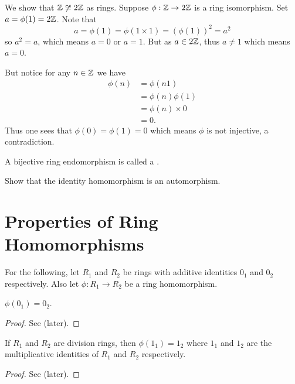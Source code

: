 \begin{example}
    We show that $\mathbb{Z} \not\cong 2\mathbb{Z}$ as rings. Suppose $\phi: \mathbb{Z} \to 2\mathbb{Z}$ is a ring isomorphism. Set $a = \phi(1) = 2\mathbb{Z}$. Note that
    \[
        a = \phi(1) = \phi(1\times1) = (\phi(1))^2 = a^2
    \]
    so $a^2 = a$, which means $a = 0$ or $a = 1$. But as $a \in 2\mathbb{Z}$, thus $a \neq 1$ which means $a = 0$.

    But notice for any $n \in \mathbb{Z}$ we have
    \begin{align*}
        \phi(n) &= \phi(n1)\\
        &= \phi(n)\phi(1)\\
        &= \phi(n) \times 0\\
        &= 0.
    \end{align*}
    Thus one sees that $\phi(0) = \phi(1) = 0$ which means $\phi$ is not injective, a contradiction.
\end{example}

\begin{definition}
    A bijective ring endomorphism is called a .
\end{definition}

\begin{exercise}\label{exercise-identity-homomorphism-is-an-isomorphism}
    Show that the identity homomorphism is an automorphism.
\end{exercise}

\section{Properties of Ring Homomorphisms}
For the following, let $R_1$ and $R_2$ be rings with additive identities $0_1$ and $0_2$ respectively. Also let $\phi: R_1 \to R_2$ be a ring homomorphism.

\begin{proposition}\label{prop-ring-image-of-additive-identity-is-additive-identity}
    $\phi(0_1) = 0_2$.
\end{proposition}
\begin{proof}
    See  (later).
\end{proof}

\begin{proposition}
    If $R_1$ and $R_2$ are division rings, then $\phi(1_1) = 1_2$ where $1_1$ and $1_2$ are the multiplicative identities of $R_1$ and $R_2$ respectively.
\end{proposition}
\begin{proof}
    See  (later).
\end{proof}

